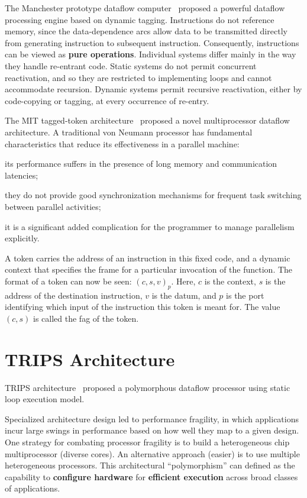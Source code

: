 \documentclass[UTF8,12pt,a4paper]{article}
\begin{document}
The Manchester prototype dataflow computer~\cite{DBLP:journals/cacm/GurdKW85} proposed
a powerful dataflow processing engine based on dynamic tagging.
Instructions do not reference memory, since the data-dependence arcs
allow data to be transmitted directly from generating instruction to subsequent instruction.
Consequently, instructions can be viewed as \textbf{pure operations}.
Individual systems differ mainly in the way they handle re-entrant code.
Static systems do not permit concurrent reactivation,
and so they are restricted to implementing loops and cannot accommodate recursion.
Dynamic systems permit recursive reactivation,
either by code-copying or tagging, at every occurrence of re-entry.

The MIT tagged-token architecture~\cite{DBLP:journals/tc/ArvindN90} proposed
a novel multiprocessor dataflow architecture.
A traditional von Neumann processor has fundamental characteristics
that reduce its effectiveness in a parallel machine:
\begin{compactitem}
  \item its performance suffers in the presence of long memory and communication latencies;
  \item they do not provide good synchronization mechanisms
        for frequent task switching between parallel activities;
  \item it is a significant added complication for the programmer to manage parallelism explicitly.
\end{compactitem}
A token carries the address of an instruction in this fixed code,
and a dynamic context that specifies the frame for a particular invocation of the function.
The format of a token can now be seen: $(c, s, v)_p$.
Here, $c$ is the context, $s$ is the address of the destination instruction, $v$ is the datum,
and $p$ is the port identifying which input of the instruction this token is meant for.
The value $(c, s)$ is called the fag of the token.

\clearpage

\section{TRIPS Architecture}

TRIPS architecture~\cite{DBLP:conf/isca/SankaralingamNLKHBKM03} proposed 
a polymorphous dataflow processor using static loop execution model.

Specialized architecture design led to performance fragility,
in which applications incur large swings in performance
based on how well they map to a given design.
One strategy for combating processor fragility is to build a heterogeneous chip multiprocessor (diverse cores).
An alternative approach (easier) is to use multiple heterogeneous processors.
This architectural ``polymorphism'' can defined as the capability to \textbf{configure hardware}
for \textbf{efficient execution} across broad classes of applications.
\end{document}
